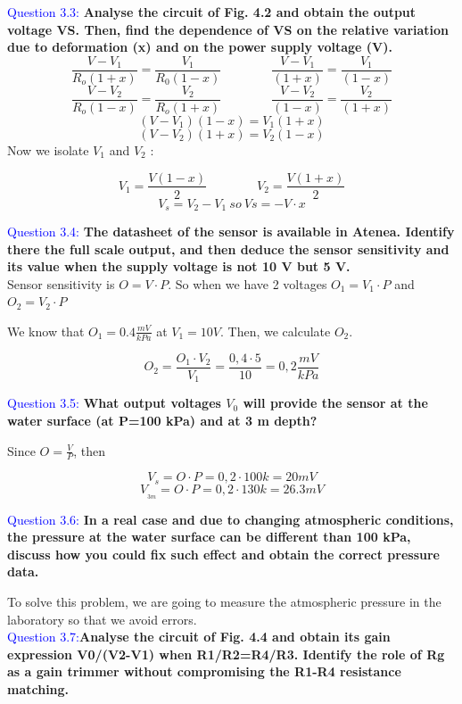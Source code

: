 \documentclass[12pt, a4papre]{article}
\begin{document}
	\textcolor{blue}{Question 3.3:} \textbf{Analyse the circuit of Fig. 4.2 and obtain the output voltage VS. Then, find the dependence of VS on the relative variation due to deformation (x) and on the power supply voltage (V). }
	\[
	\frac{V-V_{1}}{R_{o}( 1+x)} =\frac{V_{1}}{R_{0}( 1-x)} \qquad \qquad \frac{V-V_{1}}{( 1+x)} =\frac{V_{1}}{( 1-x)} 
	\]\[
	\frac{V-V_{2}}{R_{o}( 1-x)} =\frac{V_{2}}{R_{o}( 1+x)}\qquad \qquad \frac{V-V_{2}}{( 1-x)} =\frac{V_{2}}{( 1+x)} 
	\]\[
	( V-V_{1})( 1-x) =V_{1}( 1+x)
	\]\[
	( V-V_{2})( 1+x) =V_{2}( 1-x)
	\]
	Now we isolate $V_{1}$ and $V_{2}$ :
	
	\[
	V_{1} =\frac{V( 1-x)}{2}
	\qquad \qquad
	V_{2} =\frac{V( 1+x)}{2}
	\]\[
	V_{s} =V_{2} -V_{1} \ so\ Vs=-V\cdotp x
	\]
	
	\textcolor{blue}{Question 3.4:} \textbf{The datasheet of the sensor is available in Atenea. Identify there the full scale output, and then deduce the sensor sensitivity and its value when the supply voltage is not 10 V but 5 V.}\\
	
	Sensor sensitivity is $O=V\cdotp P$. So when we have 2 voltages $O_{1} =V_{1}\cdot P$ and $O_{2} =V_{2} \cdot P$

	We know that $O_1 = 0.4 \frac{mV}{kPa}$ at $V_1 = 10V$. Then, we calculate $O_2$.
	
	\[O_{2} =\frac{O_{1} \cdotp V_{2}}{V_{1}} =\frac{ 0,4\cdotp 5}{10} =0,2\frac{mV}{kPa}\]

	\textcolor{blue}{Question 3.5:} \textbf{What output voltages $V_0$ will provide the sensor at the water surface (at P=100 kPa) and at 3 m depth? }
	
	Since $O = \frac{V}{P}$, then
	
	\[V_{s} =O\cdotp P=0,2\cdotp 100k= 20mV\]
	\[V_{_{3m}} =O\cdotp P=0,2\cdotp 130k=26.3mV\]
	
	
	\textcolor{blue}{Question 3.6:} \textbf{ In a real case and due to changing atmospheric conditions, the pressure at the water surface can be different than 100 kPa, discuss how you could fix such effect and obtain the correct pressure data.} 
	
	To solve this problem, we are going to measure the atmospheric pressure in the laboratory so that we avoid errors.\\
	
	\textcolor{blue}{Question 3.7:}\textbf{Analyse the circuit of Fig. 4.4 and obtain its gain expression V0/(V2-V1) when R1/R2=R4/R3.  Identify the role of Rg as a gain trimmer without compromising the R1-R4 resistance matching.}
	
\end{document}
